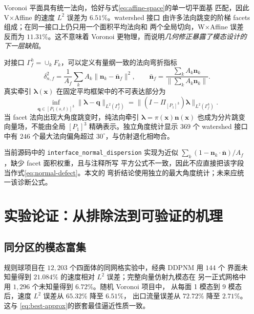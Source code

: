 \documentclass[UTF8,zihao=-4]{ctexart}
\newcommand{\proj}{\Pi}
\begin{document}
Voronoi 平面具有统一法向，恰好与式\eqref{eq:affine-space}的单一切平面基
匹配，因此 V$\times$Affine 的速度 $L^2$ 误差为 $6.51\%$。watershed 接口
由许多法向跳变的阶梯 facets 组成；在同一接口上仍只用一个面积平均法向和
两个全局切向，W$\times$Affine 误差反而为 $11.31\%$。这不意味着 Voronoi
更物理，而说明\emph{几何修正暴露了模态设计的下一层缺陷}。

对接口 $\Gamma_f^h=\cup_kF_k$，可以定义有量纲一致的法向弯折指标
\begin{equation}\label{eq:normal-defect}
  \delta_{n,f}^2
  =\frac{1}{A_f}\sum_k A_k\|\bm n_k-\bar{\bm n}_f\|^2,
  \qquad
  \bar{\bm n}_f=\frac{\sum_kA_k\bm n_k}
  {\|\sum_kA_k\bm n_k\|}.
\end{equation}
真实牵引 $\bm\lambda(\bm x)$ 在固定平均框架中的不可表达部分为
\begin{equation}
  \inf_{\bm q\in[P_1(s,t)]^3}
  \|\bm\lambda-\bm q\|_{L^2(\Gamma_f^h)}
  =\|(I-\proj_{[P_1]^3})\bm\lambda\|_{L^2(\Gamma_f^h)}.
\end{equation}
当 facet 法向出现大角度跳变时，纯法向牵引
$\bm\lambda=\pi(\bm x)\bm n(\bm x)$ 也成为分片跳变向量场，不能由全局
$[P_1]^3$ 精确表示。独立角度统计显示 $369$ 个 watershed 接口中有
$246$ 个最大法向偏角超过 $30^\circ$，与仿射退化相吻合。

当前源码中的 \texttt{interface\_normal\_dispersion} 实现为近似
$\sum_k(1-\bm n_k\cdot\bar{\bm n})/A_f$，缺少 facet 面积权重，且与注释所写
平方公式不一致，因此不应直接把该字段当作式\eqref{eq:normal-defect}。本文的
弯折结论使用独立的最大角度统计；未来应统一该诊断公式。

\section{实验论证：从排除法到可验证的机理}

\subsection{同分区的模态富集}

规则球项目在 $12{,}203$ 个四面体的同网格实验中，经典 DDPNM 用 $144$ 个
界面未知量得到 $21.084\%$ 的速度相对 $L^2$ 误差；完整向量仿射九模态在
另一正式网格中用 $1{,}296$ 个未知量得到 $6.72\%$。随机 Voronoi 项目中，
从每面 1 模态到 9 模态后，速度 $L^2$ 误差从 $65.32\%$ 降至 $6.51\%$，
出口流量误差从 $72.72\%$ 降至 $2.71\%$。这与
\eqref{eq:best-approx}的嵌套最佳逼近性质一致。
\end{document}
